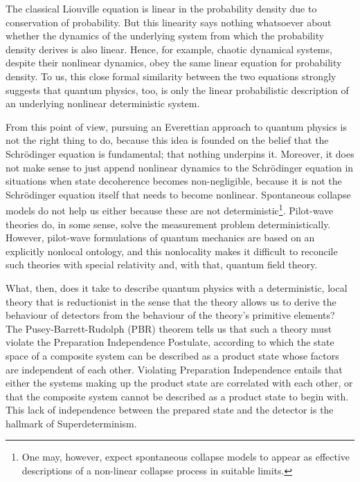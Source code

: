\documentclass[12pt]{article}
\begin{document}
The classical Liouville equation is linear in the probability density due to conservation of probability. But this linearity says nothing whatsoever about whether the dynamics of the underlying system from which the probability density derives is also linear.  Hence, for example, chaotic dynamical systems, despite their nonlinear dynamics, obey the same linear equation for  probability density. To us, this close formal similarity between the two equations strongly suggests that quantum physics, too, is only the linear probabilistic description of an underlying nonlinear deterministic system. 

From this point of view, pursuing an Everettian approach to quantum physics is not the right thing to do, because this idea is founded on the belief that the Schr\"{o}dinger equation is fundamental; that nothing underpins it. Moreover, it does not make sense to just append nonlinear dynamics to the Schr\"{o}dinger equation in situations when state decoherence becomes non-negligible, because  it is not the Schr\"{o}dinger equation itself that needs to become nonlinear. Spontaneous collapse models do not help us either because these are not deterministic\footnote{One may, however, expect spontaneous collapse models to appear as effective descriptions of a non-linear collapse process in suitable limits.}. Pilot-wave theories do, in some sense, solve the measurement problem deterministically. However, pilot-wave formulations of quantum mechanics are based on an explicitly nonlocal ontology, and this nonlocality makes it difficult to reconcile such theories with special relativity and, with that, quantum field theory.

What, then, does it take to describe quantum physics with a deterministic, local theory that is reductionist in the sense that the theory allows us to derive the behaviour of detectors from the behaviour of the theory's primitive elements? The Pusey-Barrett-Rudolph ({\sc PBR}) theorem \cite{Pusey:2011de,Leifer:2014sza} tells us that such a theory must violate the Preparation Independence Postulate, according to which the state space of a composite system can be described as a product state whose factors are independent of each other. Violating Preparation Independence entails that either the systems making up the product state are correlated with each other, or that the composite system cannot be described as a product state to begin with. This lack of independence between the prepared state and the detector is the hallmark of Superdeterminism.
\end{document}
